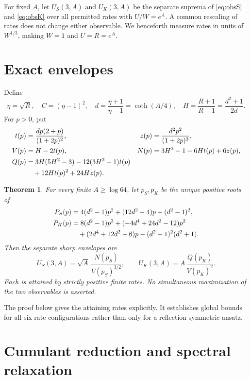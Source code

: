 \documentclass[11pt,a4paper]{article}
\newtheorem{theorem}{Theorem}
\begin{document}
For fixed $A$, let $U_S(3,A)$ and $U_K(3,A)$ be the separate suprema of \eqref{eq:obsS} and \eqref{eq:obsK} over all permitted rates with $U/W=e^A$. A common rescaling of rates does not change either observable. We henceforth measure rates in units of $W^{1/3}$, making $W=1$ and $U=R=e^A$.

\section{Exact envelopes}
Define
\begin{equation}
 \eta=\sqrt R,\quad C=(\eta-1)^2,\quad d=\frac{\eta+1}{\eta-1}=\coth(A/4),\quad H=\frac{R+1}{R-1}=\frac{d^2+1}{2d}.
\end{equation}
For $p>0$, put
\begin{align}
 t(p)&=\frac{dp(2+p)}{(1+2p)^2},& z(p)&=\frac{d^2p^2}{(1+2p)^3},\label{eq:tz}\\
 V(p)&=H-2t(p),& N(p)&=3H^2-1-6Ht(p)+6z(p),\\
 Q(p)&=3H(5H^2-3)-12(3H^2-1)t(p)\notag\\
 &\quad+12Ht(p)^2+24Hz(p).\label{eq:Q}
\end{align}
\begin{theorem}\label{thm:main}
For every finite $A\geq\log64$, let $p_S,p_K$ be the unique positive roots of
\begin{align}
 P_S(p)&=4(d^2-1)p^2+(12d^2-4)p-(d^2-1)^2,\label{eq:PS}\\
 P_K(p)&=8(d^2-1)p^3+(-4d^4+24d^2-12)p^2\notag\\
 &\quad +(2d^4+12d^2-6)p-(d^2-1)^2(d^2+1).\label{eq:PK}
\end{align}
Then the separate sharp envelopes are
\begin{equation}\label{eq:envelopes}
 U_S(3,A)=\sqrt A\,\frac{N(p_S)}{V(p_S)^{3/2}},\qquad
 U_K(3,A)=A\,\frac{Q(p_K)}{V(p_K)^2}.
\end{equation}
Each is attained by strictly positive finite rates. No simultaneous maximization of the two observables is asserted.
\end{theorem}
The proof below gives the attaining rates explicitly. It establishes global bounds for all six-rate configurations rather than only for a reflection-symmetric ansatz.

\section{Cumulant reduction and spectral relaxation}
\end{document}

